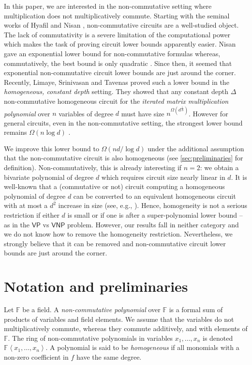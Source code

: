 \documentclass[10pt,a4paper]{article}
\def\Field{\mathbb{F}}
\let\F\Field
\def\inangle#1{\left\langle #1 \right\rangle}
\def\VP{\mathsf{VP}}
\def\VNP{\mathsf{VNP}}
\begin{document}
In this paper, we are interested in the non-commutative setting where multiplication does not multiplicatively commute. 
Starting with the seminal works of Hyafil \cite{Hya77} and Nisan \cite{Nis91}, non-commutative circuits are a well-studied object. 
The lack of commutativity is a severe limitation of the computational power which makes the task of proving circuit lower bounds apparently easier. 
Nisan gave an exponential lower bound for non-commutative formulas whereas, commutatively, the best bound is only quadratic \cite{Kal85, CKSV22}. 
Since then, it seemed that exponential non-commutative circuit lower bounds are just around the corner.  
Recently, Limaye, Srinivasan and Tavenas \cite{TLS22} proved such a lower bound in the \emph{homogeneous, constant depth} setting.
They showed that any constant depth $\Delta$ non-commutative homogeneous circuit for the \emph{iterated matrix multiplication polynomial} over $n$ variables of degree $d$ must have size $n^{\Omega(d^{\frac{1}{\Delta}})}$.
However for general circuits, even in the non-commutative setting, the strongest lower bound remains $\Omega(n\log d)$ \cite{Str73, BS83}. 

We improve this lower bound to $\Omega(nd/\log d)$ under the additional assumption that the non-commutative circuit is also homogeneous (see \autoref{sec:preliminaries} for definition). 
Non-commutatively, this is already interesting if $n=2$: we obtain a bivariate polynomial of degree $d$ which requires circuit size nearly linear in $d$. 
It is well-known that a (commutative or not) circuit computing a homogeneous polynomial of degree $d$ can be converted to an equivalent homogeneous circuit with at most a $d^2$ increase in size (see, e.g., \cite{HWY11}). 
Hence, homogeneity is not a serious restriction if either $d$ is small or if one is after a super-polynomial lower bound -- as in the $\VP$ vs $\VNP$ problem. 
However, our results fall in neither category and we do not know how to remove the homogeneity restriction.
Nevertheless, we strongly believe that it can be removed and  non-commutative circuit lower bounds are just around the corner. 

\section{Notation and preliminaries}\label{sec:preliminaries}

Let $\F$ be a field. A \emph{non-commutative polynomial} over $\F$ is a formal sum of products of variables and field elements. We assume that the variables do not multiplicatively commute, whereas they commute additively, and with elements of $\F$. 
The ring of non-commutative polynomials in variables $x_1,\dots, x_n$ is denoted $\F\inangle{x_1,\dots,x_n}$. 
A polynomial is said to be \emph{homogeneous} if all monomials with a non-zero coefficient in $f$ have the same degree. 
\end{document}
